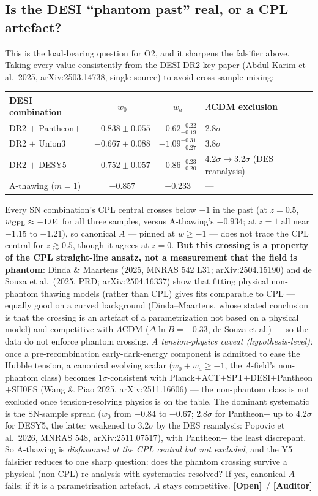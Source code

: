 \documentclass[11pt]{article}
\newcommand{\Open}{\textbf{\textcolor{gray!10!black}{[Open]}}}
\newcommand{\Auditor}{\textbf{\textcolor{teal!55!black}{[Auditor]}}}
\begin{document}
\subsection*{Is the DESI ``phantom past'' real, or a CPL artefact?}
This is the load-bearing question for O2, and it sharpens the falsifier above. Taking every value consistently from the DESI DR2 key paper (Abdul-Karim et al.\ 2025, arXiv:2503.14738, single source) to avoid cross-sample mixing:
\begin{center}\small
\begin{tabular}{lccl}\toprule
DESI combination & $w_0$ & $w_a$ & $\Lambda$CDM exclusion\\\midrule
DR2 $+$ Pantheon$+$ & $-0.838\pm0.055$ & $-0.62^{+0.22}_{-0.19}$ & 2.8$\sigma$\\
DR2 $+$ Union3 & $-0.667\pm0.088$ & $-1.09^{+0.31}_{-0.27}$ & 3.8$\sigma$\\
DR2 $+$ DESY5 & $-0.752\pm0.057$ & $-0.86^{+0.23}_{-0.20}$ & 4.2$\sigma\to$3.2$\sigma$ (DES reanalysis)\\
A-thawing ($m{=}1$) & $-0.857$ & $-0.233$ & ---\\\bottomrule
\end{tabular}\end{center}
Every SN combination's CPL central crosses below $-1$ in the past (at $z=0.5$, $w_{\rm CPL}\approx-1.04$ for all three samples, versus A-thawing's $-0.934$; at $z=1$ all near $-1.15$ to $-1.21$), so canonical $A$ --- pinned at $w\ge-1$ --- does not trace the CPL central for $z\gtrsim0.5$, though it agrees at $z=0$. \textbf{But this crossing is a property of the CPL straight-line ansatz, not a measurement that the field is phantom}: Dinda \& Maartens (2025, MNRAS 542 L31; arXiv:2504.15190) and de Souza et al.\ (2025, PRD; arXiv:2504.16337) show that fitting physical non-phantom thawing models (rather than CPL) gives fits comparable to CPL --- equally good on a curved background (Dinda--Maartens, whose stated conclusion is that the crossing is an artefact of a parametrization not based on a physical model) and competitive with $\Lambda$CDM ($\Delta\ln B=-0.33$, de Souza et al.) --- so the data do not enforce phantom crossing. \emph{A tension-physics caveat (hypothesis-level):} once a pre-recombination early-dark-energy component is admitted to ease the Hubble tension, a canonical evolving scalar ($w_0+w_a\ge-1$, the $A$-field's non-phantom class) becomes $1\sigma$-consistent with Planck$+$ACT$+$SPT$+$DESI$+$Pantheon$+$SH0ES (Wang \& Piao 2025, arXiv:2511.16606) --- the non-phantom class is not excluded once tension-resolving physics is on the table. The dominant systematic is the SN-sample spread ($w_0$ from $-0.84$ to $-0.67$; 2.8$\sigma$ for Pantheon$+$ up to 4.2$\sigma$ for DESY5, the latter weakened to 3.2$\sigma$ by the DES reanalysis: Popovic et al.\ 2026, MNRAS 548, arXiv:2511.07517), with Pantheon$+$ the least discrepant. So A-thawing is \emph{disfavoured at the CPL central but not excluded}, and the Y5 falsifier reduces to one sharp question: does the phantom crossing survive a physical (non-CPL) re-analysis with systematics resolved? If yes, canonical $A$ fails; if it is a parametrization artefact, $A$ stays competitive. \Open\ / \Auditor
\end{document}
